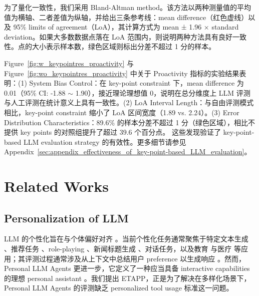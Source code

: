 \documentclass[11pt]{article}
\begin{document}
为了量化一致性，我们采用 Bland-Altman method。该方法以两种测量值的平均值为横轴、二者差值为纵轴，并给出三条参考线：mean difference（红色虚线）以及 95\% limits of agreement（LoA），其计算方式为 mean ± 1.96 × standard deviation。如果大多数数据点落在 LoA 范围内，则说明两种方法具有良好一致性。点的大小表示样本数，绿色区域则标出分差不超过 1 分的样本。




Figure~\ref{fig:w_keypointres_proactivity} 与 Figure~\ref{fig:wo_keypointres_proactivity} 中关于 Proactivity 指标的实验结果表明：(1) System Bias Control：在 key-point constraint 下，mean difference 为 0.01（95\% CI: -1.88 $\sim$ 1.90），接近理论理想值 0，说明在总分维度上 LLM 评测与人工评测在统计意义上具有一致性。(2) LoA Interval Length：与自由评测模式相比，key-point constraint 缩小了 LoA 区间宽度（1.89 vs. 2.24）。(3) Error Distribution Characteristics：89.6\% 的样本分差不超过 1 分（绿色区域），相比不提供 key points 的对照组提升了超过 39.6 个百分点。
这些发现验证了 key-point-based LLM evaluation strategy 的有效性。更多细节请参见 Appendix~\ref{sec:appendix_effectiveness_of_key-point-based_LLM_evaluation}。




\section{Related Works}

\subsection{Personalization of LLM}
LLM 的个性化旨在与个体偏好对齐 \cite{zollo2025personalllm, tseng2024talespersonallmssurvey}。当前个性化任务通常聚焦于特定文本生成 \cite{he2025cosenhancingpersonalizationmitigating, zhao2025do, lee2024aligningthousandspreferencesmessage}、推荐任务 \cite{yang2023palrpersonalizationawarellms}、role-playing \cite{wang-etal-2024-rolellm, shao-etal-2023-character}、新闻标题生成 \cite{salemi-etal-2024-lamp}、对话任务，以及教育 \cite{Pratama2023REVOLUTIONIZINGEH} 与医疗 \cite{10.1145/3437963.3441657, abbasian2024conversationalhealthagentspersonalized} 等应用；其评测过程通常涉及从上下文中总结用户 preference 以生成响应 \cite{zhang2024guidedprofilegenerationimproves}。然而，Personal LLM Agents 更进一步，它定义了一种应当具备 interactive capabilities 的理想 personal assistant \cite{singh-etal-2024-personal}。我们提出 ETAPP，正是为了解决在多样化场景下，Personal LLM Agents 的评测缺乏 personalized tool usage 标准这一问题。
\end{document}

